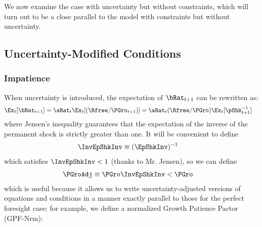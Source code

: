 \documentclass[BufferStockTheory]{subfiles}
\begin{document}
We now examine the case with uncertainty but without constraints, which will turn out to be a close parallel to the model with constraints but without uncertainty.

\hypertarget{Uncertainty-Modified-Conditions}{}
\subsection{Uncertainty-Modified Conditions}\label{subsec:UncertaintyModifiedConditions}
\subsubsection{Impatience}

When uncertainty is introduced, the expectation of $\bRat_{t+1}$ can be rewritten as:  
\begin{align}
  \Ex_{t}[\bRat_{t+1}]  & =  \aRat_{t}\Ex_{t}[(\Rfree/\PGro_{t+1})] = \aRat_{t}(\Rfree/\PGro)\Ex_{t}[\pShk_{t+1}^{-1}] \label{eq:EbRat}
\end{align}
where Jensen's inequality guarantees that the expectation of the inverse of the permanent shock is strictly greater than one.  It will be convenient to define\hypertarget{InvEpShkInv}{}
\begin{align}
  \InvEpShkInv  & \equiv  (\EpShkInv)^{-1} \label{eq:InvEpShkInv}
\end{align}
which satisfies $\InvEpShkInv < 1$ (thanks to Mr. Jensen), so we can define
\begin{align}
      \PGroAdj & \equiv \PGro \InvEpShkInv < \PGro \label{eq:PGroAdj}
\end{align}
which is useful because it allows us to write uncertainty-adjusted versions of equations and conditions in a manner exactly parallel to those for the perfect foresight case; for example, we define a normalized Growth Patience Pactor (GPF-Nrm):
\hypertarget{GICNrm}{}
\hypertarget{GICNrmI}{}
\hypertarget{PGroAdj}{}
\end{document}
